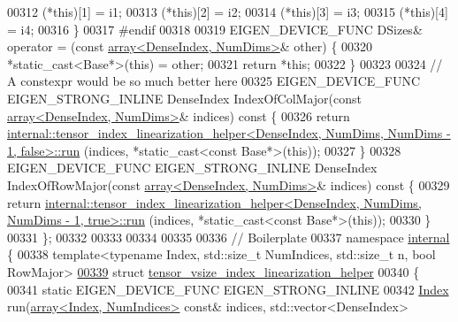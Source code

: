 \begin{DoxyCode}
00312     (*this)[1] = i1;
00313     (*this)[2] = i2;
00314     (*this)[3] = i3;
00315     (*this)[4] = i4;
00316   \}
00317 \textcolor{preprocessor}{#endif}
00318 
00319   EIGEN\_DEVICE\_FUNC DSizes& operator = (\textcolor{keyword}{const} \hyperlink{class_eigen_1_1array}{array<DenseIndex, NumDims>}& other) 
      \{
00320     *\textcolor{keyword}{static\_cast<}Base*\textcolor{keyword}{>}(\textcolor{keyword}{this}) = other;
00321     \textcolor{keywordflow}{return} *\textcolor{keyword}{this};
00322   \}
00323 
00324   \textcolor{comment}{// A constexpr would be so much better here}
00325   EIGEN\_DEVICE\_FUNC EIGEN\_STRONG\_INLINE DenseIndex IndexOfColMajor(\textcolor{keyword}{const} 
      \hyperlink{class_eigen_1_1array}{array<DenseIndex, NumDims>}& indices)\textcolor{keyword}{ const }\{
00326     \textcolor{keywordflow}{return} 
      \hyperlink{struct_eigen_1_1internal_1_1tensor__index__linearization__helper}{internal::tensor\_index\_linearization\_helper<DenseIndex, NumDims, NumDims - 1, false>::run}
      (indices, *static\_cast<const Base*>(\textcolor{keyword}{this}));
00327   \}
00328   EIGEN\_DEVICE\_FUNC EIGEN\_STRONG\_INLINE DenseIndex IndexOfRowMajor(\textcolor{keyword}{const} 
      \hyperlink{class_eigen_1_1array}{array<DenseIndex, NumDims>}& indices)\textcolor{keyword}{ const }\{
00329     \textcolor{keywordflow}{return} 
      \hyperlink{struct_eigen_1_1internal_1_1tensor__index__linearization__helper}{internal::tensor\_index\_linearization\_helper<DenseIndex, NumDims, NumDims - 1, true>::run}
      (indices, *static\_cast<const Base*>(\textcolor{keyword}{this}));
00330   \}
00331 \};
00332 
00333 
00334 
00335 
00336 \textcolor{comment}{// Boilerplate}
00337 \textcolor{keyword}{namespace }\hyperlink{namespaceinternal}{internal} \{
00338 \textcolor{keyword}{template}<\textcolor{keyword}{typename} Index, std::\textcolor{keywordtype}{size\_t} NumIndices, std::\textcolor{keywordtype}{size\_t} n, \textcolor{keywordtype}{bool} RowMajor>
\hyperlink{struct_eigen_1_1internal_1_1tensor__vsize__index__linearization__helper}{00339} \textcolor{keyword}{struct }\hyperlink{struct_eigen_1_1internal_1_1tensor__vsize__index__linearization__helper}{tensor\_vsize\_index\_linearization\_helper}
00340 \{
00341   \textcolor{keyword}{static} EIGEN\_DEVICE\_FUNC EIGEN\_STRONG\_INLINE
00342   \hyperlink{namespace_eigen_a62e77e0933482dafde8fe197d9a2cfde}{Index} run(\hyperlink{class_eigen_1_1array}{array<Index, NumIndices>} \textcolor{keyword}{const}& indices, std::vector<DenseIndex> \textcolor{keyword}{
}
\end{DoxyCode}
